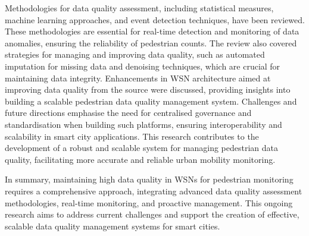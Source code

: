 Methodologies for data quality assessment, including statistical measures, machine learning approaches, and event detection techniques, have been reviewed. These methodologies are essential for real-time detection and monitoring of data anomalies, ensuring the reliability of pedestrian counts. The review also covered strategies for managing and improving data quality, such as automated imputation for missing data and denoising techniques, which are crucial for maintaining data integrity. Enhancements in WSN architecture aimed at improving data quality from the source were discussed, providing insights into building a scalable pedestrian data quality management system. Challenges and future directions emphasise the need for centralised governance and standardisation when building such platforms, ensuring interoperability and scalability in smart city applications. This research contributes to the development of a robust and scalable system for managing pedestrian data quality, facilitating more accurate and reliable urban mobility monitoring.

In summary, maintaining high data quality in WSNs for pedestrian monitoring requires a comprehensive approach, integrating advanced data quality assessment methodologies, real-time monitoring, and proactive management. This ongoing research aims to address current challenges and support the creation of effective, scalable data quality management systems for smart cities.